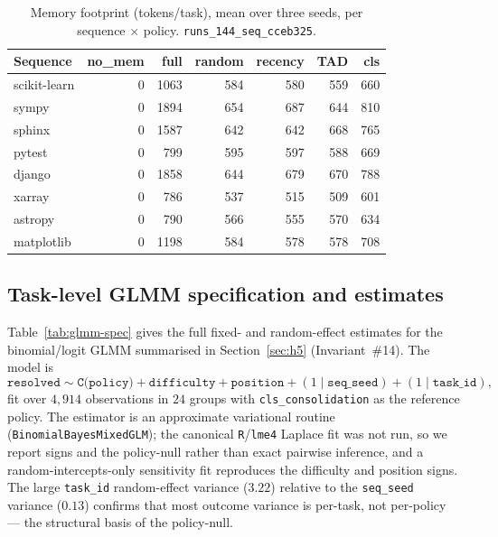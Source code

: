 \begin{table}[htbp]
  \centering
  \caption{Memory footprint (tokens/task), mean over three seeds, per sequence $\times$ policy.
  \texttt{runs\_144\_seq\_cceb325}.}
  \label{tab:per-sequence-footprint}
  \small
  \begin{tabular}{lrrrrrr}
    \toprule
    Sequence & no\_mem & full & random & recency & TAD & cls \\
    \midrule
    scikit-learn & 0 & 1063 & 584 & 580 & 559 & 660 \\
    sympy        & 0 & 1894 & 654 & 687 & 644 & 810 \\
    sphinx       & 0 & 1587 & 642 & 642 & 668 & 765 \\
    pytest       & 0 & 799  & 595 & 597 & 588 & 669 \\
    django       & 0 & 1858 & 644 & 679 & 670 & 788 \\
    xarray       & 0 & 786  & 537 & 515 & 509 & 601 \\
    astropy      & 0 & 790  & 566 & 555 & 570 & 634 \\
    matplotlib   & 0 & 1198 & 584 & 578 & 578 & 708 \\
    \bottomrule
  \end{tabular}
\end{table}

\subsection{Task-level GLMM specification and estimates}

Table~\ref{tab:glmm-spec} gives the full fixed- and random-effect estimates for the
binomial/logit GLMM summarised in Section~\ref{sec:h5} (Invariant~\#14). The model is
\[
  \texttt{resolved} \sim \texttt{C(policy)} + \texttt{difficulty} + \texttt{position}
  + (1 \mid \texttt{seq\_seed}) + (1 \mid \texttt{task\_id}),
\]
fit over $4{,}914$ observations in $24$ groups with \texttt{cls\_consolidation} as the
reference policy. The estimator is an approximate variational routine
(\texttt{BinomialBayesMixedGLM}); the canonical \texttt{R}/\texttt{lme4} Laplace fit was not
run, so we report signs and the policy-null rather than exact pairwise inference, and a
random-intercepts-only sensitivity fit reproduces the difficulty and position signs. The large
\texttt{task\_id} random-effect variance ($3.22$) relative to the \texttt{seq\_seed} variance
($0.13$) confirms that most outcome variance is per-task, not per-policy --- the structural
basis of the policy-null.


